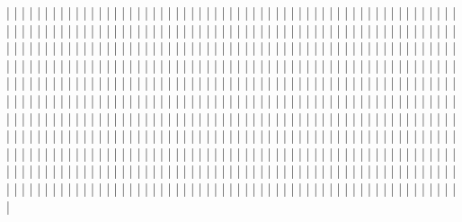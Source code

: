   |
  |
  |
  |
  |
  |
  |
  |
  |
  |
  |
  |
  |
  |
  |
  |
  |
  |
  |
  |
  |
  |
  |
  |
  |
  |
  |
  |
  |
  |
  |
  |
  |
  |
  |
  |
  |
  |
  |
  |
  |
  |
  |
  |
  |
  |
  |
  |
  |
  |
  |
  |
  |
  |
  |
  |
  |
  |
  |
  |
  |
  |
  |
  |
  |
  |
  |
  |
  |
  |
  |
  |
  |
  |
  |
  |
  |
  |
  |
  |
  |
  |
  |
  |
  |
  |
  |
  |
  |
  |
  |
  |
  |
  |
  |
  |
  |
  |
  |
  |
  |
  |
  |
  |
  |
  |
  |
  |
  |
  |
  |
  |
  |
  |
  |
  |
  |
  |
  |
  |
  |
  |
  |
  |
  |
  |
  |
  |
  |
  |
  |
  |
  |
  |
  |
  |
  |
  |
  |
  |
  |
  |
  |
  |
  |
  |
  |
  |
  |
  |
  |
  |
  |
  |
  |
  |
  |
  |
  |
  |
  |
  |
  |
  |
  |
  |
  |
  |
  |
  |
  |
  |
  |
  |
  |
  |
  |
  |
  |
  |
  |
  |
  |
  |
  |
  |
  |
  |
  |
  |
  |
  |
  |
  |
  |
  |
  |
  |
  |
  |
  |
  |
  |
  |
  |
  |
  |
  |
  |
  |
  |
  |
  |
  |
  |
  |
  |
  |
  |
  |
  |
  |
  |
  |
  |
  |
  |
  |
  |
  |
  |
  |
  |
  |
  |
  |
  |
  |
  |
  |
  |
  |
  |
  |
  |
  |
  |
  |
  |
  |
  |
  |
  |
  |
  |
  |
  |
  |
  |
  |
  |
  |
  |
  |
  |
  |
  |
  |
  |
  |
  |
  |
  |
  |
  |
  |
  |
  |
  |
  |
  |
  |
  |
  |
  |
  |
  |
  |
  |
  |
  |
  |
  |
  |
  |
  |
  |
  |
  |
  |
  |
  |
  |
  |
  |
  |
  |
  |
  |
  |
  |
  |
  |
  |
  |
  |
  |
  |
  |
  |
  |
  |
  |
  |
  |
  |
  |
  |
  |
  |
  |
  |
  |
  |
  |
  |
  |
  |
  |
  |
  |
  |
  |
  |
  |
  |
  |
  |
  |
  |
  |
  |
  |
  |
  |
  |
  |
  |
  |
  |
  |
  |
  |
  |
  |
  |
  |
  |
  |
  |
  |
  |
  |
  |
  |
  |
  |
  |
  |
  |
  |
  |
  |
  |
  |
  |
  |
  |
  |
  |
  |
  |
  |
  |
  |
  |
  |
  |
  |
  |
  |
  |
  |
  |
  |
  |
  |
  |
  |
  |
  |
  |
  |
  |
  |
  |
  |
  |
  |
  |
  |
  |
  |
  |
  |
  |
  |
  |
  |
  |
  |
  |
  |
  |
  |
  |
  |
  |
  |
  |
  |
  |
  |
  |
  |
  |
  |
  |
  |
  |
  |
  |
  |
  |
  |
  |
  |
  |
  |
  |
  |
  |
  |
  |
  |
  |
  |
  |
  |
  |
  |
  |
  |
  |
  |
  |
  |
  |
  |
  |
  |
  |
  |
  |
  |
  |
  |
  |
  |
  |
  |
  |
  |
  |
  |
  |
  |
  |
  |
  |
  |
  |
  |
  |
  |
  |
  |
  |
  |
  |
  |
  |
  |
  |
  |
  |
  |
  |
  |
  |
  |
  |
  |
  |
  |
  |
  |
  |
  |
  |
  |
  |
  |
  |
  |
  |
  |
  |
  |
  |
  |
  |
  |
  |
  |
  |
  |
  |
  |
  |
  |
  |
  |
  |
  |
  |
  |
  |
  |
  |
  |
  |
  |
  |
  |
  |
  |
  |
  |
  |
  |
  |
  |
  |
  |
  |
  |
  |
  |
  |
  |
  |
  |
  |
  |
  |
  |
  |
  |
  |
  |
  |
  |
  |
  |
  |
  |
  |
  |
  |
  |
  |
  |
  |
  |
  |
  |
  |
  |
  |
  |
  |
  |
  |
  |
  |
  |
  |
  |
  |
  |
  |
  |
  |
  |
  |
  |
  |
  |
  |
  |
  |
  |
  |
  |
  |
  |
  |
  |
  |
  |
  |
  |
  |
  |
  |
  |
  |
  |
  |
